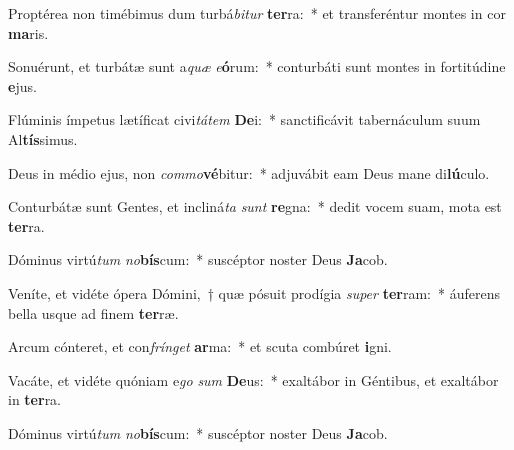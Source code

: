 \item Proptérea non timébimus dum turbá\textit{bi}\textit{tur} \textbf{ter}ra:~* et transferéntur montes in cor \textbf{ma}ris.
\item Sonuérunt, et turbátæ sunt a\textit{quæ} \textit{e}\textbf{ó}rum:~* conturbáti sunt montes in fortitúdine \textbf{e}jus.
\item Flúminis ímpetus lætíficat civi\textit{tá}\textit{tem} \textbf{De}i:~* sanctificávit tabernáculum suum Al\textbf{tís}simus.
\item Deus in médio ejus, non \textit{com}\textit{mo}\textbf{vé}bitur:~* adjuvábit eam Deus mane di\textbf{lú}culo.
\item Conturbátæ sunt Gentes, et incliná\textit{ta} \textit{sunt} \textbf{re}gna:~* dedit vocem suam, mota est \textbf{ter}ra.
\item Dóminus virtú\textit{tum} \textit{no}\textbf{bís}cum:~* suscéptor noster Deus \textbf{Ja}cob.
\item Veníte, et vidéte ópera Dómini,~† quæ pósuit prodígia \textit{su}\textit{per} \textbf{ter}ram:~* áuferens bella usque ad finem \textbf{ter}ræ.
\item Arcum cónteret, et con\textit{frín}\textit{get} \textbf{ar}ma:~* et scuta combúret \textbf{i}gni.
\item Vacáte, et vidéte quóniam e\textit{go} \textit{sum} \textbf{De}us:~* exaltábor in Géntibus, et exaltábor in \textbf{ter}ra.
\item Dóminus virtú\textit{tum} \textit{no}\textbf{bís}cum:~* suscéptor noster Deus \textbf{Ja}cob.
